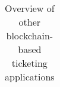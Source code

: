 \begin{landscape}
\begin{table}[]
\begin{tabular}{|l|c|c|c|c|c|c|c|c|}
\end{tabular}
\caption{Overview of other blockchain-based ticketing applications}
\label{tab:overview-competitors}
\end{table}


\end{landscape}

